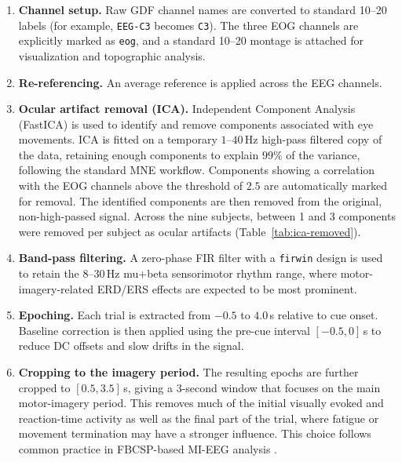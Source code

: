 \documentclass[11pt,a4paper]{article}
\begin{document}
	\begin{enumerate}[leftmargin=1.2cm]
		\item \textbf{Channel setup.}
		Raw GDF channel names are converted to standard 10--20 labels (for example,
		\texttt{EEG-C3} becomes \texttt{C3}). The three EOG channels are explicitly marked as
		\texttt{eog}, and a standard 10--20 montage is attached for visualization and topographic
		analysis.
		
		\item \textbf{Re-referencing.}
		An average reference is applied across the EEG channels.
		
		\item \textbf{Ocular artifact removal (ICA).}
		Independent Component Analysis (FastICA) is used to identify and remove components associated
		with eye movements. ICA is fitted on a temporary $1$--$40$\,Hz high-pass filtered copy of
		the data, retaining enough components to explain $99\%$ of the variance, following the standard
		MNE workflow. Components showing a correlation with the EOG channels above the threshold of
		$2.5$ are automatically marked for removal. The identified components are then removed from the
		original, non-high-passed signal. Across the nine subjects, between 1 and 3 components were
		removed per subject as ocular artifacts (Table~\ref{tab:ica-removed}).
		
		\item \textbf{Band-pass filtering.}
		A zero-phase FIR filter with a \texttt{firwin} design is used to retain the
		$8$--$30$\,Hz mu+beta sensorimotor rhythm range, where motor-imagery-related ERD/ERS effects
		are expected to be most prominent.
		
		\item \textbf{Epoching.}
		Each trial is extracted from $-0.5$ to $4.0$\,s relative to cue onset. Baseline correction
		is then applied using the pre-cue interval $[-0.5, 0]$\,s to reduce DC offsets and slow
		drifts in the signal.
		
		\item \textbf{Cropping to the imagery period.}
		The resulting epochs are further cropped to $[0.5, 3.5]$\,s, giving a $3$-second window
		that focuses on the main motor-imagery period. This removes much of the initial
		visually evoked and reaction-time activity as well as the final part of the trial, where
		fatigue or movement termination may have a stronger influence. This choice follows common
		practice in FBCSP-based MI-EEG analysis \cite{ang2008fbcsp}.
	\end{enumerate}
	
\end{document}
